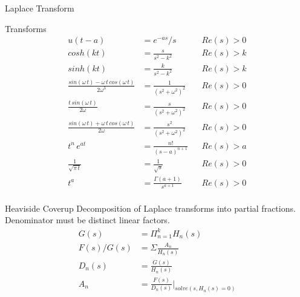 \begin{section}{Laplace Transform}
\begin{subsection}{Transforms}
\begin{align*}
      u(t-a)&= e^{-as}/s && Re(s) > 0\\
      cosh(kt) &= \frac{s}{s^2-k^2} && Re(s) > k\\
      sinh(kt) &= \frac{k}{s^2-k^2} && Re(s) > k\\
      \frac{sin(\omega\,t)-\omega\,t\,cos(\omega\,t)}{2\omega^3}
           &= \frac{1}{(s^2+\omega^2)^2} && Re(s) > 0\\
      \frac{t\,sin(\omega\,t)}{2\omega}
           &= \frac{s}{(s^2+\omega^2)^2} && Re(s) > 0\\
      \frac{sin(\omega\,t)+\omega\,t\,cos(\omega\,t)}{2\omega}
           &= \frac{s^2}{(s^2+\omega^2)^2} && Re(s) > 0\\
      t^n\,e^{at} &= \frac{n!}{(s-a)^{n+1}} && Re(s) > a\\
      \frac{1}{\sqrt{\pi\,t}} &= \frac{1}{\sqrt{s}} && Re(s) > 0\\
      t^a &= \frac{\Gamma(a+1)}{s^{a+1}} && Re(s) > 0\\
    \end{align*}
  \end{subsection}
  \begin{subsection}{Heaviside Coverup}
    Decomposition of Laplace transforms into partial
    fractions. Denominator must be distinct linear factors.
    \begin{align*}
      G(s) &= \Pi_{n=1}^{k} H_n(s)\\
      F(s)/G(s) &= \Sigma \frac{A_n}{H_{n}(s)}\\
      D_{n}(s) &=\frac{G(s)}{H_n(s)}\\
      A_n &= \frac{F(s)}{D_{n}(s)} \biggr\rvert_{solve(s,H_{n}(s)=0)}\\
    \end{align*}
  \end{subsection}
\end{section}
